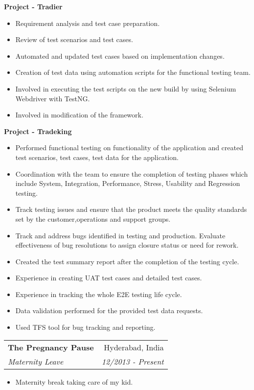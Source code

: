 \documentclass[letterpaper,11pt]{article}
\makeatletter
\newcommand{\resumeSubheading}[4]{
  \vspace{-1pt}\item
    \begin{tabular*}{0.97\textwidth}[t]{l@{\extracolsep{\fill}}r}
      \textbf{#1} & #2 \\
      \textit{\small#3} & \textit{\small #4} \\
    \end{tabular*}\vspace{-5pt}
}
\newcommand{\resumeItemListStart}{\begin{itemize}}
\newcommand{\resumeItemListEnd}{\end{itemize}\vspace{-5pt}}
\makeatother
\begin{document}
      \textbf{Project - Tradier}
      \resumeItemListStart
        \item{Requirement analysis and test case preparation.}
        \item{Review of test scenarios and test cases.}
        \item{Automated and updated test cases based on implementation changes.}
        \item{Creation of test data using automation scripts for the functional testing team.}
        \item{Involved in executing the test scripts on the new build by using Selenium Webdriver with TestNG.}
        \item{Involved in modification of the framework.}
     \resumeItemListEnd
     \pagebreak
     \textbf{Project - Tradeking}
      \resumeItemListStart
        \item{Performed functional testing on functionality of the application and created test scenarios, test cases, test data for the application.}
        \item{Coordination with the team to ensure the completion of testing phases which include System,
            Integration, Performance, Stress, Usability and Regression testing.}
        \item{Track testing issues and ensure that the product meets the quality standards set by the customer,operations and support groups.}
        \item{Track and address bugs identified in testing and production. Evaluate effectiveness of bug
            resolutions to assign closure status or need for rework.}
        \item{Created the test summary report after the completion of the testing cycle.}
        \item{Experience in creating UAT test cases and detailed test cases.}
        \item{Experience in tracking the whole E2E testing life cycle.}
        \item{Data validation performed for the provided test data requests.}
        \item{Used TFS tool for bug tracking and reporting.}
     \resumeItemListEnd
    
    \resumeSubheading
      {The Pregnancy Pause}{Hyderabad, India}
      {Maternity Leave}{12/2013 - Present}
      \resumeItemListStart
        \item{Maternity break taking care of my kid.}
      \resumeItemListEnd
      
\end{document}
